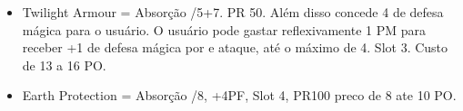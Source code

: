 \begin{itemize}
\item Twilight Armour = Absorção /5+7. PR 50. Além disso concede 4 de defesa mágica para o usuário. O usuário pode gastar reflexivamente 1 PM para receber +1 de defesa mágica por e ataque, até o máximo de 4. Slot 3. Custo de 13 a 16 PO.

\item Earth Protection = Absorção /8, +4PF, Slot 4, PR100 preco de 8 ate 10 PO.







 


\end{itemize}	
